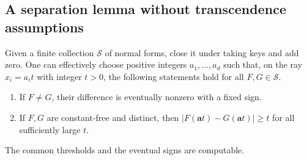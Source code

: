 \documentclass[11pt]{article}
\begin{document}
\subsection{A separation lemma without transcendence assumptions}

\begin{lemma}\label{lem:ray}
Given a finite collection $\mathcal S$ of normal forms, close it under
taking keys and add zero.  One can effectively choose positive integers
$a_1,\ldots,a_d$ such that, on the ray $x_i=a_it$ with integer $t>0$,
the following statements hold for all $F,G\in\mathcal S$.
\begin{enumerate}
\item If $F\ne G$, their difference is eventually nonzero with a fixed
      sign.
\item If $F,G$ are constant-free and distinct, then
      $|F(\mathbf a t)-G(\mathbf a t)|\ge t$ for all sufficiently large
      $t$.
\end{enumerate}
The common thresholds and the eventual signs are computable.
\end{lemma}
\end{document}
